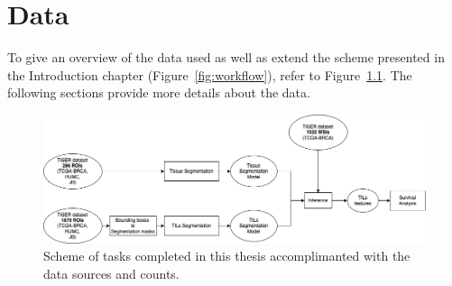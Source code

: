 \chapter{Data}
To give an overview of the data used as well as extend the scheme presented in
the Introduction chapter (Figure~\ref*{fig:workflow}), refer to Figure~\ref*{fig:data_flow}.
The following sections provide more details about the data.

\begin{figure}[h]
  \centering
  \includegraphics[width=\linewidth]{figures/data_flow.png} 
  \caption{Scheme of tasks completed in this thesis accomplimanted with the data sources and counts.} 
  \label{fig:data_flow}
\end{figure} 

